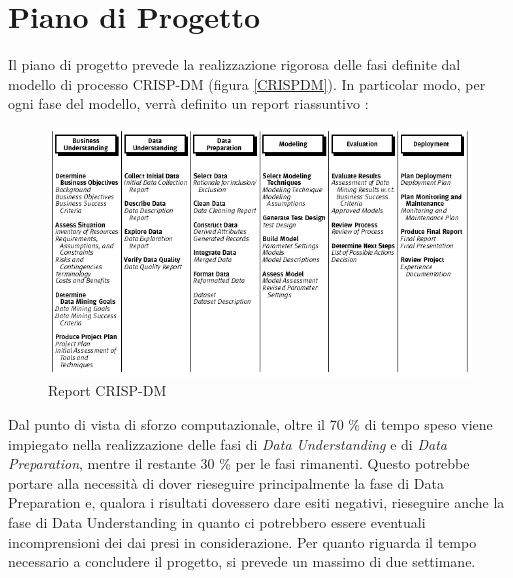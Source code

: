 \section{Piano di Progetto}
Il piano di progetto prevede la realizzazione rigorosa delle fasi definite dal modello di processo CRISP-DM (figura \ref{CRISPDM}).
In particolar modo, per ogni fase del modello, verrà definito un report riassuntivo : 

\begin{figure}[hbtp]
	\centering
	\includegraphics[width=1\textwidth]{./images/Metodologia_CRISP_DM.png}
	\caption{Report CRISP-DM}
	\label{Report_CRISPDM}
\end{figure}

Dal punto di vista di sforzo computazionale, oltre il 70 \% di tempo speso viene impiegato nella realizzazione delle fasi di \textit{Data Understanding} e di \textit{Data Preparation}, mentre il restante 30 \% per le fasi rimanenti.
Questo potrebbe portare alla necessità di dover rieseguire principalmente la fase di Data Preparation e, qualora i risultati dovessero dare esiti negativi, rieseguire anche la fase di Data Understanding in quanto ci potrebbero essere eventuali incomprensioni dei dai presi in considerazione.
Per quanto riguarda il tempo necessario a concludere il progetto, si prevede un massimo di due settimane.